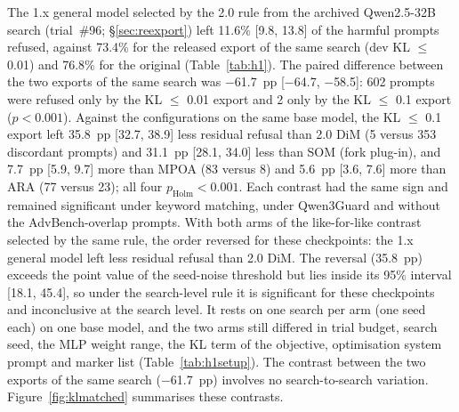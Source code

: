 The 1.x general model selected by the 2.0 rule from the archived Qwen2.5-32B search (trial~\#96;
\S\ref{sec:reexport}) left 11.6\% [9.8, 13.8] of the harmful prompts refused, against 73.4\% for the released
export of the same search (dev KL $\le$ 0.01) and 76.8\% for the original (Table~\ref{tab:h1}). The paired
difference between the two exports of the same search was $-$61.7~pp [$-$64.7, $-$58.5]: 602 prompts were refused
only by the KL $\le$ 0.01 export and 2 only by the KL $\le$ 0.1 export ($p<0.001$). Against the configurations on
the same base model, the KL $\le$ 0.1 export left 35.8~pp [32.7, 38.9] less residual refusal than 2.0 DiM (5 versus
353 discordant prompts) and 31.1~pp [28.1, 34.0] less than SOM (fork plug-in), and 7.7~pp [5.9, 9.7] more than MPOA
(83 versus 8) and 5.6~pp [3.6, 7.6] more than ARA (77 versus 23); all four $p_\mathrm{Holm}<0.001$. Each contrast
had the same sign and remained significant under keyword matching, under Qwen3Guard and without the AdvBench-overlap
prompts. With both arms of the like-for-like contrast selected by the same rule, the order reversed for these
checkpoints: the 1.x general model left less residual refusal than 2.0 DiM. The reversal (35.8~pp) exceeds the point
value of the seed-noise threshold but lies inside its 95\% interval [18.1, 45.4], so under the search-level rule it
is significant for these checkpoints and inconclusive at the search level. It rests on one search per arm (one seed
each) on one base model, and the two arms still differed in trial budget, search seed, the MLP weight range, the KL
term of the objective, optimisation system prompt and marker list (Table~\ref{tab:h1setup}). The contrast between the
two exports of the same search ($-$61.7~pp) involves no search-to-search variation. Figure~\ref{fig:klmatched}
summarises these contrasts.

